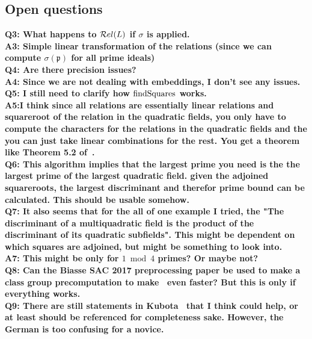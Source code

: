 \subsection{Open questions}
{\bf Q3: What happens to $\mathcal{R}el(L)$ if $\sigma$ is applied.\\
A3: Simple linear transformation of the relations (since we can compute $\sigma (\mathfrak{p})$ for all prime ideals)\\
\noindent
Q4: Are there precision issues?\\
A4: Since we are not dealing with embeddings, I don't see any issues.\\
\noindent
Q5: I still need to clarify how ${\rm findSquares}$ works.\\
A5:I think since all relations are essentially linear relations and squareroot of the 
relation in the quadratic fields, you only have to compute the characters for the relations in the 
quadratic fields and the you can just take linear combinations for the rest.
You get a theorem like Theorem 5.2 of~\cite{DBLP:conf/eurocrypt/BauchBVLV17}.\\
\noindent
Q6: This algorithm implies that the largest prime you need is the the largest prime of the largest quadratic field.
given the adjoined squareroots, the largest discriminant and therefor prime bound can be calculated.
This should be usable somehow.\\
\noindent
Q7: It also seems that for the all of one example I tried, the 
"The discriminant of a multiquadratic field is the product of the discriminant of its quadratic subfields".
This might be dependent on which squares are adjoined, but might be something to look into.\\
A7: This might be only for $1 \bmod 4$ primes? Or maybe not?\\
\noindent
Q8: Can the Biasse SAC 2017 preprocessing paper be used to make a class group precomputation to 
make~\cite{DBLP:conf/eurocrypt/BauchBVLV17} even faster? But this is only if everything works.\\
\noindent
Q9: There are still statements in Kubota~\cite{kubota1956} that I think could help, 
or at least should be referenced for completeness sake.
However, the German is too confusing for a novice.
}

